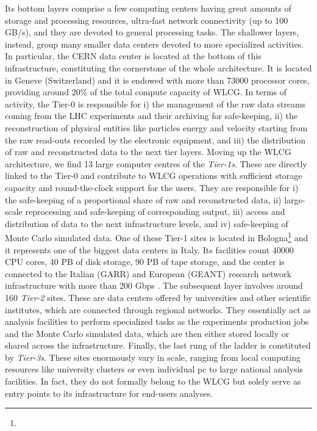 Its bottom layers comprise a few computing centers having great amounts of storage and processing resources, ultra-fast network connectivity (up to 100 GB/s), and they are devoted to general processing tasks.
The shallower layers, instead, group many smaller data centers devoted to more specialized activities.
In particular, the CERN data center is located at the bottom of this infrastructure, constituting the cornerstone of the whole architecture. 
It is located in Geneve (Switzerland) and it is endowed with more than 73000 processor cores, providing around 20\% of the total compute capacity of WLCG.
In terms of activity, the Tier-0 is responsible for i) the management of the raw data streams coming from the LHC experiments and their archiving for safe-keeping, ii) the reconstruction of physical entities like particles energy and velocity starting from the raw read-outs recorded by the electronic equipment, and iii) the distribution of raw and reconstructed data to the next tier layers.
Moving up the WLCG architecture, we find 13 large computer centres of the \textit{Tier-1s}.
These are directly linked to the Tier-0 and contribute to WLCG operations with sufficient storage capacity and round-the-clock support for the users. They are responsible for i) the safe-keeping of a proportional share of raw and reconstructed data, ii) large-scale reprocessing and safe-keeping of corresponding output, iii) access and distribution of data to the next infrastructure levels, and iv) safe-keeping of Monte Carlo simulated data.
One of these Tier-1 sites is located in Bologna\footnote{\cnaf} and it represents one of the biggest data centers in Italy. Its facilities count 40000 CPU cores, 40 PB of disk storage, 90 PB of tape storage, and the center is connected to the Italian (GARR) and European (GEANT) research network infrastructure with more than 200 Gbps \cite{cnaf2019annualrep, dell2019cnaf}.
The subsequent layer involves around 160 \textit{Tier-2} sites. These are data centers offered by universities and other scientific institutes, which are connected 
through regional networks. 
They essentially act as analysis facilities to perform specialized tasks as the experiments production jobs and the Monte Carlo simulated data, which are then either stored locally or shared across the infrastructure.
Finally, the last rung of the ladder is constituted by \textit{Tier-3s}. These sites enormously vary in scale,  ranging from local computing resources like university clusters or even individual pc to large national analysis facilities.
In fact, they do not formally belong to the WLCG but solely serve as entry points to its infrastructure for end-users analyses.


